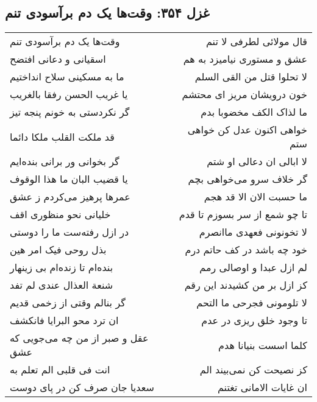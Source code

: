 \begin{center}
\section*{غزل ۳۵۴: وقت‌ها یک دم برآسودی تنم}
\label{sec:354}
\begin{longtable}{l p{0.5cm} r}
وقت‌ها یک دم برآسودی تنم
&&
قال مولائی لطرفی لا تنم
\\
اسقیانی و دعانی افتضح
&&
عشق و مستوری نیامیزد به هم
\\
ما به مسکینی سلاح انداختیم
&&
لا تحلوا قتل من القی السلم
\\
یا غریب الحسن رفقا بالغریب
&&
خون درویشان مریز ای محتشم
\\
گر نکردستی به خونم پنجه تیز
&&
ما لذاک الکف مخضوبا بدم
\\
قد ملکت القلب ملکا دائما
&&
خواهی اکنون عدل کن خواهی ستم
\\
گر بخوانی ور برانی بنده‌ایم
&&
لا ابالی ان دعالی او شتم
\\
یا قضیب البان ما هذا الوقوف
&&
گر خلاف سرو می‌خواهی بچم
\\
عمرها پرهیز می‌کردم ز عشق
&&
ما حسبت الان الا قد هجم
\\
خلیانی نحو منظوری اقف
&&
تا چو شمع از سر بسوزم تا قدم
\\
در ازل رفته‌ست ما را دوستی
&&
لا تخونونی فعهدی ماانصرم
\\
بذل روحی فیک امر هین
&&
خود چه باشد در کف حاتم درم
\\
بنده‌ام تا زنده‌ام بی زینهار
&&
لم ازل عبدا و اوصالی رمم
\\
شنعة العذال عندی لم تفد
&&
کز ازل بر من کشیدند این رقم
\\
گر بنالم وقتی از زخمی قدیم
&&
لا تلومونی فجرحی ما التحم
\\
ان ترد محو البرایا فانکشف
&&
تا وجود خلق ریزی در عدم
\\
عقل و صبر از من چه می‌جویی که عشق
&&
کلما اسست بنیانا هدم
\\
انت فی قلبی الم تعلم به
&&
کز نصیحت کن نمی‌بیند الم
\\
سعدیا جان صرف کن در پای دوست
&&
ان غایات الامانی تغتنم
\\
\end{longtable}
\end{center}
